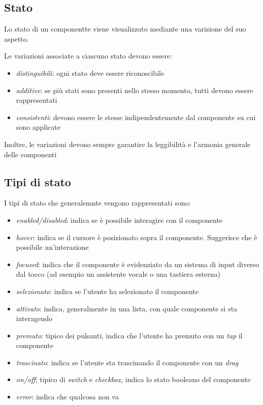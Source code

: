 \documentclass[12pt, a4paper]{report}
\begin{document}
		\subsection{Stato}
		Lo stato di un componentte viene visualizzato mediante una varizione del suo aspetto.
		
		Le variazioni associate a ciascuno stato devono essere:
		\begin{itemize}
			\item \textit{distinguibili}: ogni stato deve essere riconoscibile
			\item \textit{additive}: se più stati sono presenti nello stesso momento, tutti devono essere rappresentati
			\item \textit{consistenti}: devono essere le stesse indipendentemente dal componente su cui sono applicate
		\end{itemize}
		
		Inoltre, le variazioni devono sempre garantire la leggibilità e l'armonia generale delle componenti
		
			\subsection{Tipi di stato}
			I tipi di stato che generalemnte vengono rappresentati sono:
			\begin{itemize}
				\item \textit{enabled/disabled}: indica se è possibile interagire con il componente
				\item \textit{hover}: indica se il cursore è posizionato sopra il componente. Suggerisce che è possibile un'interazione
				\item \textit{focused}: indica che il componente è evidenziato da un sistema di input diverso dal tocco (ad esempio un assistente vocale o una tastiera esterna)
				\item \textit{selezionato}: indica se l'utente ha selezionato il componente
				\item \textit{attivato}: indica, generalmente in una lista, con quale componente si sta interagendo
				\item \textit{premuto}: tipico dei pulsanti, indica che l'utente ha premuto con un \textit{tap} il componente
				\item \textit{trascinato}: indica se l'utente sta trascinando il componente con un \textit{drag}
				\item \textit{on/off}; tipico di \textit{switch} e \textit{checkbox}, indica lo stato booleano del componente
				\item \textit{error}: indica che qualcosa non va
			\end{itemize}
\end{document}
